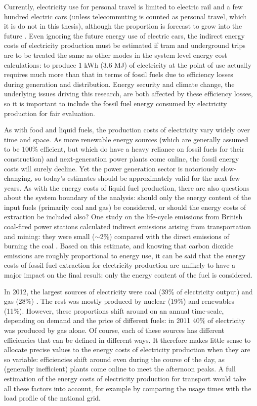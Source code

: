 Currently, electricity use for personal travel is limited to electric
rail and a few hundred electric cars (unless telecommuting is counted as
personal travel, which it is do not in this thesis),
although the proportion is forecast to grow into the future \citep{Skea2010}.
Even ignoring the future energy use of electric cars, the indirect energy costs
of electricity production must be estimated if 
tram and underground trips are to be treated the same as other modes in the
system level energy cost calculations: to produce 1 kWh (3.6 MJ) of electricity
at the point of use actually requires much more than that in terms of fossil
fuels due to efficiency losses during generation and distribution. Energy
security and climate change, the underlying issues driving this research, are
both affected by these efficiency losses, so it is important to include the
fossil fuel energy consumed by electricity production for fair evaluation.

As with food and liquid fuels, the production costs of electricity vary widely
over time and space. As more renewable energy sources (which are generally
assumed to be 100\% efficient, but which do have a heavy reliance on fossil
fuels for their construction) and next-generation power plants come online,
the fossil energy costs will surely decline. Yet the power generation sector is
notoriously slow-changing, so today's estimates should be approximately valid
for the next few years. As with the energy costs of liquid fuel production,
there are also questions about the system boundary of the analysis: should only
the energy content of the input fuels (primarily coal and gas) be considered,
or should the energy costs of extraction be included also? One study on the
life-cycle emissions from British coal-fired power stations calculated indirect
emissions arising from transportation and mining: they were small ($\sim$2\%)
compared with the direct emissions of burning the coal \citep{Odeh2008212}.
Based on this estimate, and knowing that carbon dioxide emissions are roughly
proportional to energy use, it can be said that the energy costs of fossil fuel
extraction for electricity production are unlikely to have a major impact on
the final result: only the energy content of the fuel is considered.

In 2012, the largest sources of electricity were coal (39\% of electricity
output) and gas (28\%) \citep{Decc2013-elec}. The rest was mostly produced by
nuclear (19\%) and renewables (11\%). However, these proportions shift around
on an annual time-scale, depending on demand and the price of different fuels:
in 2011 40\% of electricity was produced by gas alone. Of course, each of
these sources has different efficiencies that can be defined in different ways.
It therefore makes little sense to allocate precise values to the energy costs
of electricity production when they are so variable: efficiencies shift around
even during the course of the day, as (generally inefficient) plants come
online to meet the afternoon peaks. A full estimation of the energy costs of
electricity production for transport would take all these factors into account,
for example by comparing the usage times with the load profile of the national
grid.

